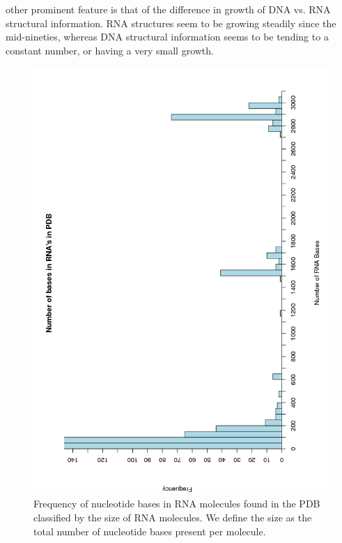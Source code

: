 other prominent feature is that of the difference in growth of DNA vs.
RNA structural information. RNA structures seem to be growing steadily
since the mid-nineties, whereas DNA structural information seems to be
tending to a constant number, or having a very small growth.
\begin{figure}
\centering
\includegraphics[scale=0.60, angle=270]{Chapter2/histogram.png}
\caption{Frequency of  nucleotide bases in RNA molecules  found in the
  PDB classified by  the size of RNA molecules. We  define the size as
  the total number of nucleotide bases present per molecule.}
  \label{fig:rnaranges}
\end{figure}


